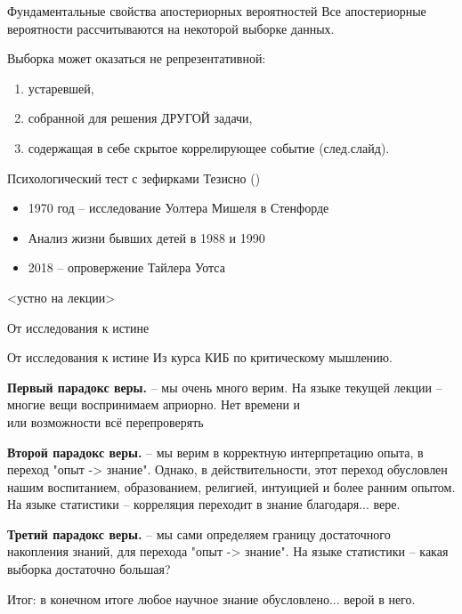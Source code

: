 \begin{frame}{Фундаментальные свойства апостериорных вероятностей}
	Все апостериорные вероятности рассчитываются на некоторой выборке данных.
	
	Выборка может оказаться не репрезентативной:
	\begin{enumerate}
		\item устаревшей,
		\item собранной для решения ДРУГОЙ задачи,
		\item содержащая в себе скрытое коррелирующее событие (след.слайд).
	\end{enumerate}


\end{frame}

\begin{frame}{Психологический тест с зефирками}
	Тезисно ()
	\begin{itemize}
		\item 1970 год -- исследование Уолтера Мишеля в Стенфорде
		\item Анализ жизни бывших детей в 1988 и 1990
		\item 2018 -- опровержение Тайлера Уотса
	\end{itemize}
	
	<устно на лекции>	
\end{frame}

\begin{frame}{От исследования к истине}
\end{frame}

\begin{frame}{От исследования к истине}
	\footnotesize
	Из курса КИБ по критическому мышлению.
	
	\textbf{Первый парадокс веры.} -- мы очень много верим.
	На языке текущей лекции -- многие вещи воспринимаем априорно. Нет времени и\\или возможности всё перепроверять
	
	\textbf{Второй парадокс веры.} -- мы верим в корректную интерпретацию опыта, в переход "опыт -> знание".
	Однако, в действительности, этот переход обусловлен нашим воспитанием, образованием, религией, интуицией и более ранним опытом.
	На языке статистики -- корреляция переходит в знание благодаря... вере.
	
	\textbf{Третий парадокс веры.} -- мы сами определяем границу достаточного накопления знаний, для перехода "опыт -> знание". 
	На языке статистики -- какая выборка достаточно большая? 
	
	Итог: в конечном итоге любое научное знание обусловлено... верой в него.
\end{frame}



